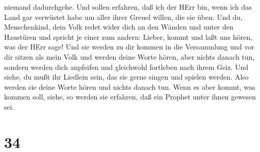 niemand dadurchgehe.  Und sollen erfahren, daß ich der HErr
bin, wenn ich das Land gar verwüstet habe um aller ihrer Greuel willen,
die sie üben.  Und du, Menschenkind, dein Volk redet wider
dich an den Wänden und unter den Haustüren und spricht je einer zum
andern: Lieber, kommt und laßt uns hören, was der HErr sage!
 Und sie werden zu dir kommen in die Versammlung und vor
dir sitzen als mein Volk und werden deine Worte hören, aber nichts
danach tun, sondern werden dich anpfeifen und gleichwohl fortleben nach
ihrem Geiz.  Und siehe, du mußt ihr Liedlein sein, das sie
gerne singen und spielen werden. Also werden sie deine Worte hören und
nichts danach tun.  Wenn es aber kommt, was kommen soll,
siehe, so werden sie erfahren, daß ein Prophet unter ihnen gewesen sei.

\hypertarget{section-33}{%
\section{34}\label{section-33}}

